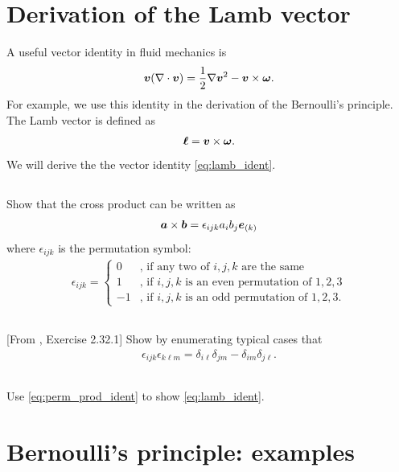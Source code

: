 \documentclass[11pt,letterpaper]{article}
\begin{document}
\section{Derivation of the Lamb vector}
A useful vector identity in fluid mechanics is
\begin{align}
    \boldsymbol{v}(\nabla\cdot\boldsymbol{v}) = \frac{1}{2}\nabla\boldsymbol{v}^2-\boldsymbol{v}\times\boldsymbol{\omega}.\label{eq:lamb_ident}
\end{align}
For example, we use this identity in the derivation of the Bernoulli's principle. The Lamb vector is defined as
\begin{align}
    \boldsymbol{\ell} = \boldsymbol{v}\times\boldsymbol{\omega}.
\end{align}
We will derive the the vector identity \eqref{eq:lamb_ident}.

\subsection{}
Show that the cross product can be written as
\begin{align}
    \boldsymbol{a}\times \boldsymbol{b} = \epsilon_{ijk}a_ib_j\boldsymbol{e}_{(k)}
\end{align}
where $\epsilon_{ijk}$ is the permutation symbol:
\begin{align}
    \epsilon_{ijk} = \begin{cases}
        0 &\text{, if any two of $i,j,k$ are the same}\\
        1 &\text{, if $i,j,k$ is an even permutation of $1,2,3$}\\
        -1 &\text{, if $i,j,k$ is an odd permutation of $1,2,3$}.
    \end{cases}
\end{align}

\subsection{}
[From \cite{Aris_62}, Exercise 2.32.1] Show by enumerating typical cases that
\begin{align}
    \epsilon_{ijk}\epsilon_{k\ell m} = \delta_{i\ell}\delta_{jm}-\delta_{im}\delta_{j\ell}.\label{eq:perm_prod_ident}
\end{align}

\subsection{}
Use \eqref{eq:perm_prod_ident} to show \eqref{eq:lamb_ident}.

\newpage
\section{Bernoulli's principle: examples}
\end{document}
